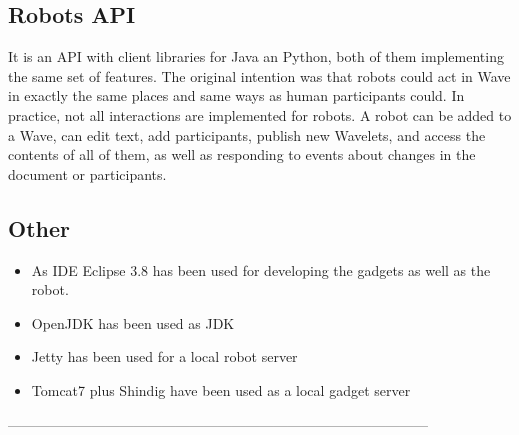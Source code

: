 \subsection{Robots API}

It is an API with client libraries for Java an Python, both of them implementing the same set of features. The original intention was that robots could act in Wave in exactly the same places and same ways as human participants could. In practice, not all interactions are implemented for robots. A robot can be added to a Wave, can edit text, add participants, publish new Wavelets, and access the contents of all of them, as well as responding to events about changes in the document or participants.


\subsection{Other}

\begin{itemize}
  \item As IDE Eclipse 3.8 has been used for developing the gadgets as well as the robot.
  \item OpenJDK has been used as JDK
  \item Jetty has been used for a local robot server
  \item Tomcat7 plus Shindig have been used as a local gadget server 
\end{itemize}


\begin{center}
------------------------------------------------------------------------------------------\\
\end{center}

